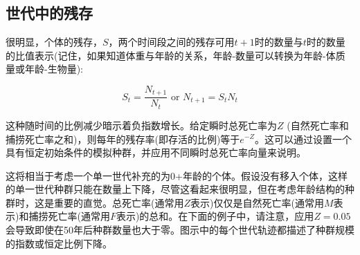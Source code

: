 \documentclass[
  lang=cn,
  11pt,
  scheme=chinese,
  chinesefont=nofont,
  citestyle=gb7714-2015,
  bibstyle=gb7714-2015]{elegantbook}
\begin{document}
\subsection{世代中的残存}\label{ux4e16ux4ee3ux4e2dux7684ux6b8bux5b58}

很明显，个体的残存，\(S\)，两个时间段之间的残存可用\(t+1\)时的数量与\(t\)时的数量的比值表示(记住，如果知道体重与年龄的关系，年龄-数量可以转换为年龄-体质量或年龄-生物量):

\begin{equation}  
S_t=\frac{{{N}_{t+1}}}{{{N}_{t}}}\text{ or }{{N}_{t+1}}={S_t}{N}_{t}  
\label{eq:eq33}
\end{equation}

这种随时间的比例减少暗示着负指数增长。给定瞬时总死亡率为\(Z\) (自然死亡率和捕捞死亡率之和)，则每年的残存率(即存活的比例)等于\(e^{−Z}\)。这可以通过设置一个具有恒定初始条件的模拟种群，并应用不同瞬时总死亡率向量来说明。

这将相当于考虑一个单一世代补充的为0+年龄的个体。假设没有移入个体，这样的单一世代种群只能在数量上下降，尽管这看起来很明显，但在考虑年龄结构的种群时，这是重要的直觉。总死亡率(通常用\(Z\)表示)仅仅是自然死亡率(通常用\(M\)表示)和捕捞死亡率(通常用\(F\)表示)的总和。在下面的例子中，请注意，应用\(Z =0.05\) 会导致即使在50年后种群数量也大于零。图示中的每个世代轨迹都描述了种群规模的指数或恒定比例下降。
\end{document}
